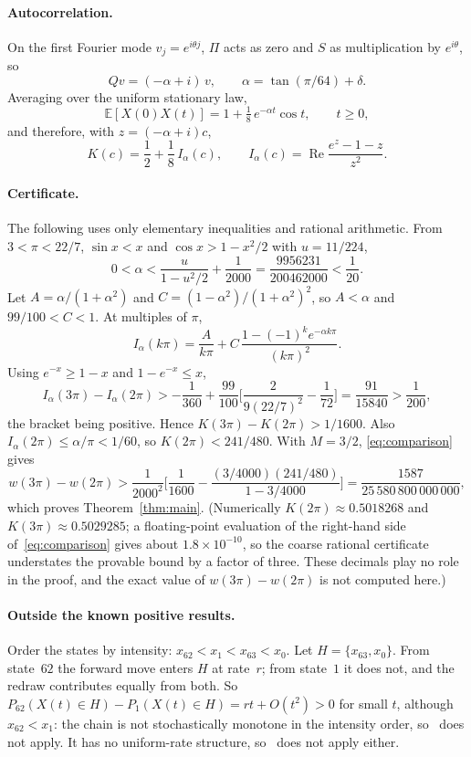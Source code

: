\documentclass[11pt]{article}
\newcommand{\E}{\mathbb{E}}
\theoremstyle{remark}
\begin{document}
\paragraph{Autocorrelation.} On the first Fourier mode $v_j=e^{i\theta j}$, $\Pi$ acts as zero and $S$ as multiplication by $e^{i\theta}$, so
\[
Qv=(-\alpha+i)\,v,\qquad \alpha=\tan(\pi/64)+\delta .
\]
Averaging over the uniform stationary law,
\begin{equation}
\E[X(0)X(t)]=1+\tfrac18\,e^{-\alpha t}\cos t,\qquad t\ge0,
\label{eq:autocorr}
\end{equation}
and therefore, with $z=(-\alpha+i)c$,
\begin{equation}
K(c)=\frac12+\frac18\,I_\alpha(c),\qquad I_\alpha(c)=\operatorname{Re}\frac{e^{z}-1-z}{z^2}.
\label{eq:kernel}
\end{equation}

\paragraph{Certificate.} The following uses only elementary inequalities and rational arithmetic. From $3<\pi<22/7$, $\sin x<x$ and $\cos x>1-x^2/2$ with $u=11/224$,
\[
0<\alpha<\frac{u}{1-u^2/2}+\frac1{2000}=\frac{9956231}{200462000}<\frac1{20}.
\]
Let $A=\alpha/(1+\alpha^2)$ and $C=(1-\alpha^2)/(1+\alpha^2)^2$, so $A<\alpha$ and $99/100<C<1$. At multiples of $\pi$,
\[
I_\alpha(k\pi)=\frac{A}{k\pi}+C\,\frac{1-(-1)^ke^{-\alpha k\pi}}{(k\pi)^2}.
\]
Using $e^{-x}\ge1-x$ and $1-e^{-x}\le x$,
\[
I_\alpha(3\pi)-I_\alpha(2\pi)>-\frac1{360}+\frac{99}{100}\Big[\frac{2}{9(22/7)^2}-\frac1{72}\Big]=\frac{91}{15840}>\frac1{200},
\]
the bracket being positive. Hence $K(3\pi)-K(2\pi)>1/1600$. Also $I_\alpha(2\pi)\le\alpha/\pi<1/60$, so $K(2\pi)<241/480$. With $M=3/2$, \eqref{eq:comparison} gives
\[
w(3\pi)-w(2\pi)>\frac1{2000^2}\Big[\frac1{1600}-\frac{(3/4000)(241/480)}{1-3/4000}\Big]=\frac{1587}{25\,580\,800\,000\,000},
\]
which proves Theorem~\ref{thm:main}. (Numerically $K(2\pi)\approx0.5018268$ and $K(3\pi)\approx0.5029285$; a floating-point evaluation of the right-hand side of~\eqref{eq:comparison} gives about $1.8\times10^{-10}$, so the coarse rational certificate understates the provable bound by a factor of three. These decimals play no role in the proof, and the exact value of $w(3\pi)-w(2\pi)$ is not computed here.)

\paragraph{Outside the known positive results.} Order the states by intensity: $x_{62}<x_1<x_{63}<x_0$. Let $H=\{x_{63},x_0\}$. From state~$62$ the forward move enters $H$ at rate~$r$; from state~$1$ it does not, and the redraw contributes equally from both. So $P_{62}(X(t)\in H)-P_1(X(t)\in H)=rt+O(t^2)>0$ for small $t$, although $x_{62}<x_1$: the chain is not stochastically monotone in the intensity order, so~\cite{br} does not apply. It has no uniform-rate structure, so~\cite{ccp} does not apply either.
\end{document}
